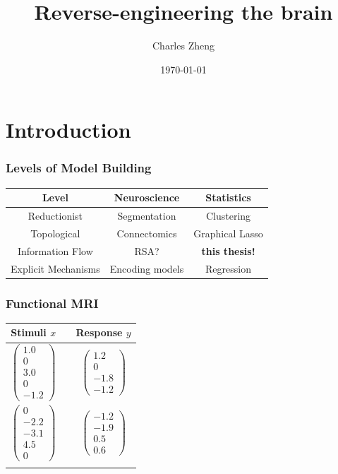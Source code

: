 \documentclass{beamer}
\title[Proposal]{Reverse-engineering the brain}
\author{Charles Zheng} %
\institute[Stanford] %
{Stanford University}
\date{\today} %
\begin{document}
\begin{frame}
\titlepage %
\end{frame}

\section{Introduction}
{

}

\begin{frame}
\frametitle{Levels of Model Building}
\begin{center}
\begin{tabular}{c|c|c}
Level & Neuroscience & Statistics\\
\hline
Reductionist & Segmentation & Clustering\\
Topological & Connectomics & Graphical Lasso\\
Information Flow & RSA? & \textbf{this thesis!}\\
Explicit Mechanisms & Encoding models & Regression
\end{tabular}
\end{center}
\end{frame}

{

}

\begin{frame}
\frametitle{Functional MRI}
\begin{center}
\begin{tabular}{ccc}
\hline
Stimuli $x$ & & Response $y$\\ \hline
$\begin{pmatrix}1.0 \\ 0 \\ 3.0 \\ 0\\ -1.2\end{pmatrix}$ & \hspace{1in} & $\begin{pmatrix}1.2 \\ 0 \\ -1.8\\ -1.2\end{pmatrix}$ \\ \hline
$\begin{pmatrix}0 \\ -2.2 \\ -3.1 \\ 4.5\\ 0\end{pmatrix}$ & \hspace{1in} & $\begin{pmatrix}-1.2 \\ -1.9\\ 0.5\\ 0.6\end{pmatrix}$ \\ \hline
\hspace{1in} & \hspace{1in} & \hspace{1in}
\end{tabular}
\end{center}
\end{frame}
\end{document}
